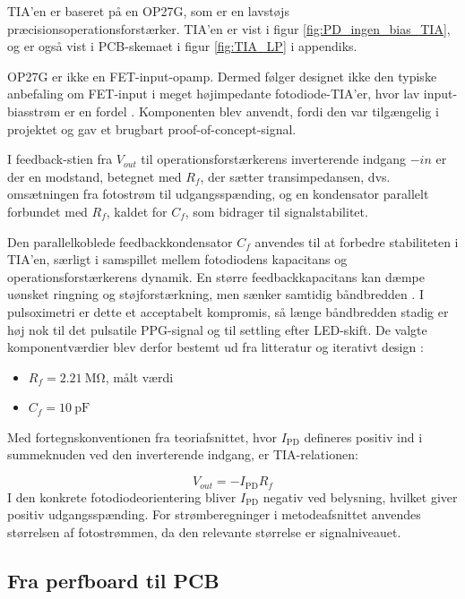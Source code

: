 TIA'en er baseret på en OP27G, som er en lavstøjs præcisionsoperationsforstærker. TIA'en er vist i figur \ref{fig:PD_ingen_bias_TIA}, og er også vist i PCB-skemaet i figur \ref{fig:TIA_LP} i appendiks.

OP27G er ikke en FET-input-opamp. Dermed følger designet ikke den typiske anbefaling om FET-input i meget højimpedante fotodiode-TIA'er, hvor lav input-biasstrøm er en fordel \cite[s.~81]{Webster1997}. Komponenten blev anvendt, fordi den var tilgængelig i projektet og gav et brugbart proof-of-concept-signal.

I feedback-stien fra $V_{out}$ til operationsforstærkerens inverterende indgang $-in$ er der en modstand, betegnet med $R_f$, der sætter transimpedansen, dvs. omsætningen fra fotostrøm til udgangsspænding, og en kondensator parallelt forbundet med $R_f$, kaldet for $C_f$, som bidrager til signalstabilitet. 

Den parallelkoblede feedbackkondensator $C_f$ anvendes til at forbedre stabiliteten i TIA'en, særligt i samspillet mellem fotodiodens kapacitans og operationsforstærkerens dynamik. En større feedbackkapacitans kan dæmpe uønsket ringning og støjforstærkning, men sænker samtidig båndbredden \cite[s.~81--82]{Webster1997}. I pulsoximetri er dette et acceptabelt kompromis, så længe båndbredden stadig er høj nok til det pulsatile PPG-signal og til settling efter LED-skift. De valgte komponentværdier blev derfor bestemt ud fra litteratur og iterativt design \cite{analog_tia_stabilize}:

\begin{itemize}
    \item $R_f = \SI{2.21}{\mega\ohm}$, målt værdi
    \item $C_f = \SI{10}{\pico\farad}$
\end{itemize}

Med fortegnskonventionen fra teoriafsnittet, hvor $I_{\mathrm{PD}}$ defineres positiv ind i summeknuden ved den inverterende indgang, er TIA-relationen:

\begin{equation}
    V_{out} = -I_{\mathrm{PD}} R_f
\end{equation}
I den konkrete fotodiodeorientering bliver $I_{\mathrm{PD}}$ negativ ved belysning, hvilket giver positiv udgangsspænding. For strømberegninger i metodeafsnittet anvendes størrelsen af fotostrømmen, da den relevante størrelse er signalniveauet.

\subsection{Fra perfboard til PCB}

